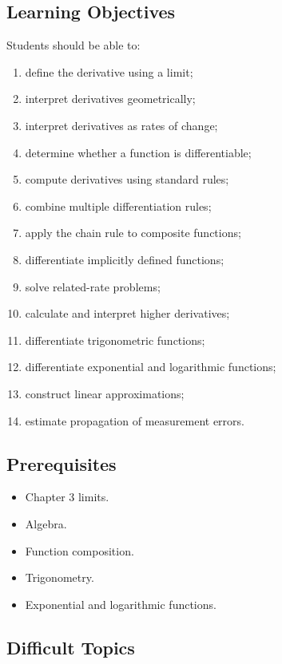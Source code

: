 \documentclass[11pt]{article}
\begin{document}
\subsection{Learning Objectives}

Students should be able to:

\begin{enumerate}
    \item define the derivative using a limit;
    \item interpret derivatives geometrically;
    \item interpret derivatives as rates of change;
    \item determine whether a function is differentiable;
    \item compute derivatives using standard rules;
    \item combine multiple differentiation rules;
    \item apply the chain rule to composite functions;
    \item differentiate implicitly defined functions;
    \item solve related-rate problems;
    \item calculate and interpret higher derivatives;
    \item differentiate trigonometric functions;
    \item differentiate exponential and logarithmic functions;
    \item construct linear approximations;
    \item estimate propagation of measurement errors.
\end{enumerate}

\subsection{Prerequisites}

\begin{itemize}
    \item Chapter 3 limits.
    \item Algebra.
    \item Function composition.
    \item Trigonometry.
    \item Exponential and logarithmic functions.
\end{itemize}

\subsection{Difficult Topics}
\end{document}
